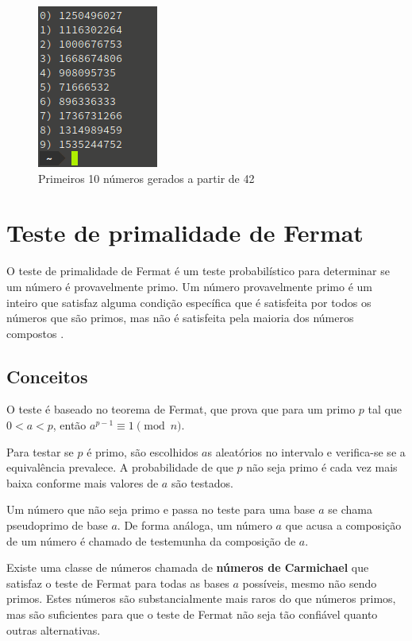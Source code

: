 \documentclass[12pt]{article}
\begin{document}
\begin{figure}[ht]
    \centering
    \includegraphics{lcg_output.png}
    \caption{Primeiros 10 números gerados a partir de 42}
    \label{fig:lcg_output}
\end{figure}

\section{Teste de primalidade de Fermat}

O teste de primalidade de Fermat é um teste probabilístico para determinar se
um número é provavelmente primo. Um número provavelmente primo é um inteiro que
satisfaz alguma condição específica que é satisfeita por todos os números que
são primos, mas não é satisfeita pela maioria dos números compostos
\cite{cormen:01}.

\subsection{Conceitos}

O teste é baseado no teorema de Fermat, que prova que para um primo $p$ tal que
$0 < a < p$, então $a^{p - 1} \equiv 1 \pmod{n}$.

Para testar se $p$ é primo, são escolhidos $a$s aleatórios no intervalo e
verifica-se se a equivalência prevalece. A probabilidade de que $p$ não seja
primo é cada vez mais baixa conforme mais valores de $a$ são testados.

Um número que não seja primo e passa no teste para uma base $a$ se chama
pseudoprimo de base $a$. De forma análoga, um número $a$ que acusa a composição
de um número é chamado de testemunha da composição de $a$.

Existe uma classe de números chamada de \textbf{números de Carmichael} que
satisfaz o teste de Fermat para todas as bases $a$ possíveis, mesmo não sendo
primos. Estes números são substancialmente mais raros do que números primos,
mas são suficientes para que o teste de Fermat não seja tão confiável quanto
outras alternativas.
\end{document}
